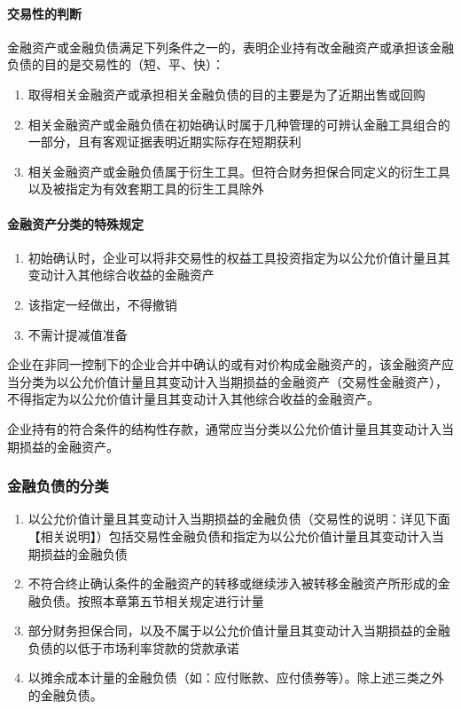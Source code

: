 \documentclass[UTF8,12pt]{ctexart}
\numberwithin{equation}{section} %
\numberwithin{figure}{section}
\numberwithin{table}{section}
\begin{document}
	\paragraph{交易性的判断}
	
	金融资产或金融负债满足下列条件之一的，表明企业持有改金融资产或承担该金融负债的目的是交易性的（短、平、快）：
	\begin{enumerate}
		\item 取得相关金融资产或承担相关金融负债的目的主要是为了近期出售或回购
		
		\item 相关金融资产或金融负债在初始确认时属于几种管理的可辨认金融工具组合的一部分，且有客观证据表明近期实际存在短期获利
		
		\item 相关金融资产或金融负债属于衍生工具。但符合财务担保合同定义的衍生工具以及被指定为有效套期工具的衍生工具除外
	\end{enumerate}
	

	\paragraph{金融资产分类的特殊规定}
		\begin{enumerate}
		\item 初始确认时，企业可以将非交易性的权益工具投资指定为以公允价值计量且其变动计入其他综合收益的金融资产
		
		\item 该指定一经做出，不得撤销
		
		\item 不需计提减值准备
	\end{enumerate}

	企业在非同一控制下的企业合并中确认的或有对价构成金融资产的，该金融资产应当分类为以公允价值计量且其变动计入当期损益的金融资产（交易性金融资产），不得指定为以公允价值计量且其变动计入其他综合收益的金融资产。
	
	企业持有的符合条件的结构性存款，通常应当分类以公允价值计量且其变动计入当期损益的金融资产。
	
	\subsubsection{金融负债的分类}
	
	\begin{enumerate}
		\item 以公允价值计量且其变动计入当期损益的金融负债（交易性的说明：详见下面【相关说明】）包括交易性金融负债和指定为以公允价值计量且其变动计入当期损益的金融负债
		
		\item 不符合终止确认条件的金融资产的转移或继续涉入被转移金融资产所形成的金融负债。按照本章第五节相关规定进行计量
		
		\item 部分财务担保合同，以及不属于以公允价值计量且其变动计入当期损益的金融负债的以低于市场利率贷款的贷款承诺
		
		\item 以摊余成本计量的金融负债（如：应付账款、应付债券等）。除上述三类之外的金融负债。
		
	\end{enumerate}
\end{document}
